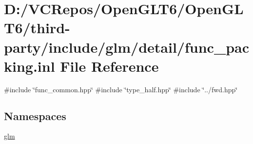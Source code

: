 \hypertarget{func__packing_8inl}{}\section{D\+:/\+V\+C\+Repos/\+Open\+G\+L\+T6/\+Open\+G\+L\+T6/third-\/party/include/glm/detail/func\+\_\+packing.inl File Reference}
\label{func__packing_8inl}
{\ttfamily \#include \char`\"{}func\+\_\+common.\+hpp\char`\"{}}\newline
{\ttfamily \#include \char`\"{}type\+\_\+half.\+hpp\char`\"{}}\newline
{\ttfamily \#include \char`\"{}../fwd.\+hpp\char`\"{}}\newline
\subsection*{Namespaces}
\begin{DoxyCompactItemize}
\item 
 \mbox{\hyperlink{namespaceglm}{glm}}
\end{DoxyCompactItemize}
